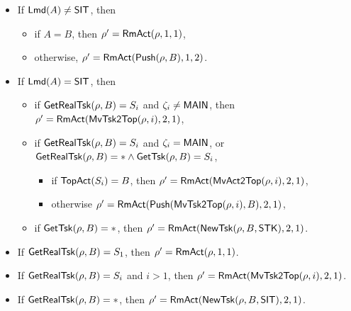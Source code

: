 \noindent  {}
	\begin{itemize}
		\item  If ${\sf Lmd}(A) \neq {\sf SIT}$, then
        \begin{itemize}
            \item if $A = B$, then $\rho' = \mathsf{RmAct}(\rho, 1, 1)$,
            \item otherwise, $\rho' = \mathsf{RmAct}(\mathsf{Push}(\rho, B), 1, 2)$.
        \end{itemize}
		\item If ${\sf Lmd}(A) = {\sf SIT}$, then
    		\begin{itemize}
                \item if $\mathsf{GetRealTsk}(\rho,B) = S_i$ and $\zeta_i\neq{\sf MAIN}$, then $\rho'=\mathsf{RmAct}(\mathsf{MvTsk2Top}(\rho, i), 2, 1)$,
                \item if $\mathsf{GetRealTsk}(\rho,B) = S_i$ and $\zeta_i = {\sf MAIN}$, or $\mathsf{GetRealTsk}(\rho,B) = *\wedge \mathsf{GetTsk}(\rho,B) = S_i$, 
                \begin{itemize}
                    \item if $\mathsf{TopAct}(S_i) = B$, then $\rho' = \mathsf{RmAct}(\mathsf{MvAct2Top}(\rho,i), 2, 1)$,
                    \item otherwise $\rho'=\mathsf{RmAct}(\mathsf{Push}(\mathsf{MvTsk2Top}(\rho, i),B), 2, 1)$,
                \end{itemize}
    			\item if $\mathsf{GetTsk}(\rho, B)=*$, then $\rho'= \mathsf{RmAct}(\mathsf{NewTsk}(\rho,B, {\sf STK}), 2, 1)$.
    		\end{itemize}
	 \end{itemize}
	
\noindent {}
\begin{itemize}
	\item If $\mathsf{GetRealTsk}(\rho, B) = S_1$, then $\rho' = \mathsf{RmAct}(\rho, 1, 1)$.
	\item If $\mathsf{GetRealTsk}(\rho, B) = S_i$ and $i > 1$, then $\rho' = \mathsf{RmAct}(\mathsf{MvTsk2Top}(\rho, i), 2, 1)$.
	\item If $\mathsf{GetRealTsk}(\rho, B) = *$, then $\rho' = \mathsf{RmAct}(\mathsf{NewTsk}(\rho, B,{\sf SIT}), 2, 1)$.
\end{itemize}

